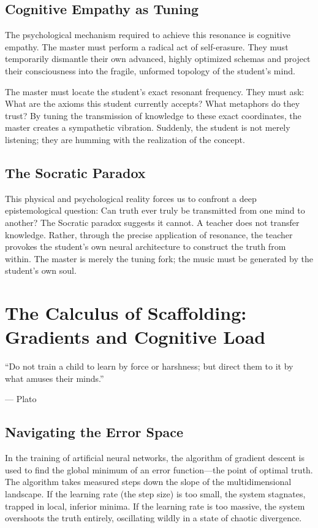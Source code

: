 \documentclass[11pt,a4paper,oneside]{book}
\theoremstyle{definition}
\theoremstyle{remark}
\begin{document}
\section{Cognitive Empathy as Tuning}
The psychological mechanism required to achieve this resonance is cognitive empathy. The master must perform a radical act of self-erasure. They must temporarily dismantle their own advanced, highly optimized schemas and project their consciousness into the fragile, unformed topology of the student’s mind. 

The master must locate the student’s exact resonant frequency. They must ask: What are the axioms this student currently accepts? What metaphors do they trust? By tuning the transmission of knowledge to these exact coordinates, the master creates a sympathetic vibration. Suddenly, the student is not merely listening; they are humming with the realization of the concept.

\section{The Socratic Paradox}
This physical and psychological reality forces us to confront a deep epistemological question: Can truth ever truly be transmitted from one mind to another? The Socratic paradox suggests it cannot. A teacher does not transfer knowledge. Rather, through the precise application of resonance, the teacher provokes the student's own neural architecture to construct the truth from within. The master is merely the tuning fork; the music must be generated by the student’s own soul.

\chapter{The Calculus of Scaffolding: Gradients and Cognitive Load}
\epigraph{``Do not train a child to learn by force or harshness; but direct them to it by what amuses their minds.''}{--- Plato}

\section{Navigating the Error Space}
In the training of artificial neural networks, the algorithm of gradient descent is used to find the global minimum of an error function---the point of optimal truth. The algorithm takes measured steps down the slope of the multidimensional landscape. If the learning rate (the step size) is too small, the system stagnates, trapped in local, inferior minima. If the learning rate is too massive, the system overshoots the truth entirely, oscillating wildly in a state of chaotic divergence.
\end{document}
